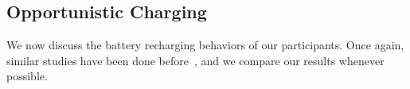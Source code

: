 \subsection{Opportunistic Charging}
\label{subsec-opportunistic}

We now discuss the battery recharging behaviors of our participants. Once again,
similar studies have been done before~\cite{banerjee:ubicomp:2007,
rahmati:mobilehci:2007}, and we compare our results whenever possible.
